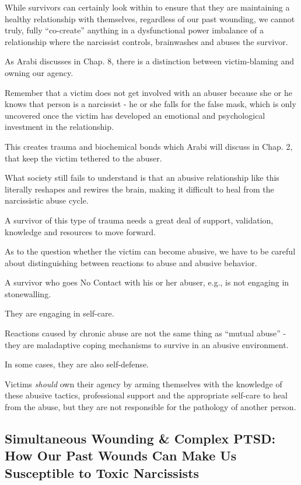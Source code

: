 \documentclass[oneside]{book}
\numberwithin{equation}{section}
\begin{document}
%
While survivors can certainly look within to ensure that they are maintaining a healthy relationship with themselves, regardless of our past wounding, we cannot truly, fully ``co-create'' anything in a dysfunctional power imbalance of a relationship where the narcissist controls, brainwashes and abuses the survivor.

As Arabi discusses in Chap. 8, there is a distinction between victim-blaming and owning our agency.

%
Remember that a victim does not get involved with an abuser because she or he knows that person is a narcissist - he or she falls for the false mask, which is only uncovered once the victim has developed an emotional and psychological investment in the relationship.

%
This creates trauma and biochemical bonds which Arabi will discuss in Chap. 2, that keep the victim tethered to the abuser.

What society still fails to understand is that an abusive relationship like this literally reshapes and rewires the brain, making it difficult to heal from the narcissistic abuse cycle.

A survivor of this type of trauma needs a great deal of support, validation, knowledge and resources to move forward.


%
As to the question whether the victim can become abusive, we have to be careful about distinguishing between reactions to abuse and abusive behavior.

A survivor who goes No Contact with his or her abuser, e.g., is not engaging in stonewalling.

They are engaging in self-care.

Reactions caused by chronic abuse are not the same thing as ``mutual abuse'' - they are maladaptive coping mechanisms to survive in an abusive environment.

In some cases, they are also self-defense.

%
Victims \textit{should} own their agency by arming themselves with the knowledge of these abusive tactics, professional support and the appropriate self-care to heal from the abuse, but they are not responsible for the pathology of another person.

\subsection{Simultaneous Wounding \& Complex PTSD: How Our Past Wounds Can Make Us Susceptible to Toxic Narcissists}
\end{document}
